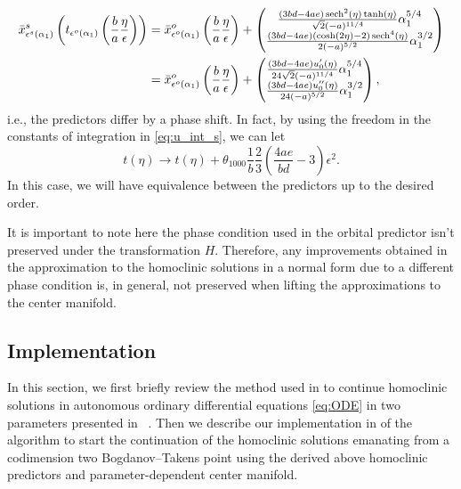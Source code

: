 \begin{align*}
    \bar x_{\epsilon^s(\alpha_1)}^s\left(t_{\epsilon^o(\alpha_1)}\left(\frac{b}{a}\frac{\eta}{\epsilon}\right)\right) 
    &= \bar x_{\epsilon^o(\alpha_1)}^o\left(\frac{b}{a}\frac{\eta}{\epsilon} \right) +
        \begin{pmatrix}
            \frac{(3 b d - 4 a e) \operatorname{sech}^2(\eta) \tanh( \eta )}{\sqrt2 (-a)^{ 11/4 }} \alpha_1^{5/4} \\
            \frac{(3 b d - 4 a e)(\cosh (2 \eta )-2) \operatorname{sech}^4(\eta) }{2 (-a)^{5/2}} \alpha_1^{3/2}
        \end{pmatrix} \\
    &= \bar x_{\epsilon^o(\alpha_1)}^o\left(\frac{b}{a}\frac{\eta}{\epsilon} \right) +
        \begin{pmatrix}
            \frac{(3 b d - 4 a e) u_0'(\eta)}{24\sqrt2 (-a)^{ 11/4 }} \alpha_1^{5/4} \\
            \frac{(3 b d - 4 a e) u_0''(\eta)}{24 (-a)^{5/2}} \alpha_1^{3/2}
        \end{pmatrix},
\end{align*}
i.e., the predictors differ by a phase shift. In fact, by using the freedom in
the constants of integration in \cref{eq:u_int_s}, we can let 
\[
    t(\eta) \rightarrow t(\eta) + \theta_{1000} \frac{1}{b} \frac{2}{3}
    \left(\frac{4 a e}{b d}-3\right) \epsilon^2.
\] 
In this case, we will have equivalence between the predictors up to the desired
order. 

\begin{remark}
It is important to note here the phase condition used in the orbital
predictor isn't preserved under the transformation $H$. Therefore,
any improvements obtained in the approximation to the homoclinic solutions in a
normal form due to a different phase condition is, in general, not preserved
when lifting the approximations to the center manifold.
\end{remark}

\subsection{Implementation}%
\label{sec:implementation}
In this section, we first briefly review the method used in \MATCONT to continue
homoclinic solutions in autonomous ordinary differential equations 
\cref{eq:ODE} in two parameters presented in ~\cite{DeWitte2012}. Then we
describe our implementation in \MATCONT of the algorithm to start the continuation of
the homoclinic solutions emanating from a codimension two Bogdanov--Takens point
using the derived above homoclinic predictors and parameter-dependent center manifold.

